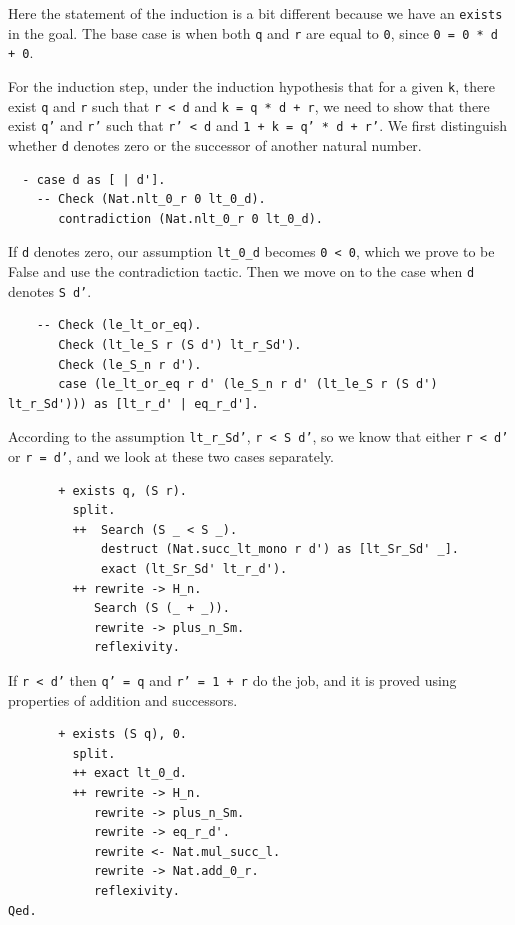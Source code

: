 \documentclass{article}
\begin{document}
Here the statement of the induction is a bit different because we have an \texttt{exists} in the goal. The base case is when both \texttt{q} and \texttt{r} are equal to \texttt{0}, since \texttt{0 = 0 * d + 0}.

For the induction step, under the induction hypothesis that for a given \texttt{k}, there exist \texttt{q} and \texttt{r} such that \texttt{r < d} and \texttt{k = q * d + r}, we need to show that there exist \texttt{q'} and \texttt{r'} such that \texttt{r' < d} and \texttt{1 + k = q' * d + r'}. We first distinguish whether \texttt{d} denotes zero or the successor of another natural number.
\begin{lstlisting}
  - case d as [ | d'].
    -- Check (Nat.nlt_0_r 0 lt_0_d).
       contradiction (Nat.nlt_0_r 0 lt_0_d).
\end{lstlisting}

If \texttt{d} denotes zero, our assumption \texttt{lt\_0\_d} becomes \texttt{0 < 0}, which we prove to be False and use the contradiction tactic. Then we move on to the case when \texttt{d} denotes \texttt{S d'}. 
\begin{lstlisting}
    -- Check (le_lt_or_eq).
       Check (lt_le_S r (S d') lt_r_Sd').
       Check (le_S_n r d').
       case (le_lt_or_eq r d' (le_S_n r d' (lt_le_S r (S d') lt_r_Sd'))) as [lt_r_d' | eq_r_d'].
\end{lstlisting}

According to the assumption \texttt{lt\_r\_Sd'}, \texttt{r < S d'}, so we know that either \texttt{r < d'} or \texttt{r = d'}, and we look at these two cases separately.
\begin{lstlisting}
       + exists q, (S r).
         split.
         ++  Search (S _ < S _).
             destruct (Nat.succ_lt_mono r d') as [lt_Sr_Sd' _].
             exact (lt_Sr_Sd' lt_r_d').
         ++ rewrite -> H_n.
            Search (S (_ + _)).
            rewrite -> plus_n_Sm.
            reflexivity.
\end{lstlisting}

If \texttt{r < d'} then \texttt{q' = q} and \texttt{r' = 1 + r} do the job, and it is proved using properties of addition and successors.

\begin{lstlisting}
       + exists (S q), 0.
         split.
         ++ exact lt_0_d.
         ++ rewrite -> H_n.
            rewrite -> plus_n_Sm.
            rewrite -> eq_r_d'.
            rewrite <- Nat.mul_succ_l.
            rewrite -> Nat.add_0_r.
            reflexivity.
Qed.
\end{lstlisting}
\end{document}
